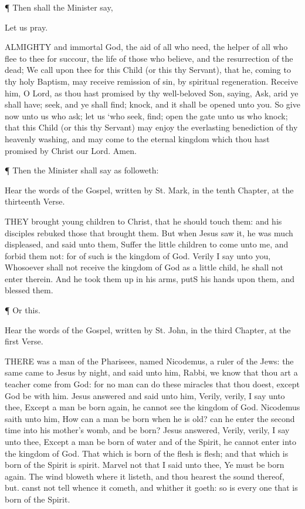¶ Then shall the Minister say,

Let us pray.

ALMIGHTY and immortal God, the aid of all who need, the helper of all who flee to thee for succour, the life of those who believe, and the resurrection of the dead; We call upon thee for this Child (or this thy Servant), that he, coming to thy holy Baptism, may receive remission of sin, by spiritual regeneration. Receive him, O Lord, as thou hast promised by thy well-beloved Son, saying, Ask, arid ye shall have; seek, and ye shall find; knock, and it shall be opened unto you. So give now unto us who ask; let us ‘who seek, find; open the gate unto us who knock; that this Child (or this thy Servant) may enjoy the everlasting benediction of thy heavenly washing, and may come to the eternal kingdom which thou hast promised by Christ our Lord. Amen.
 

 
¶ Then the Minister shall say as followeth:

    Hear the words of the Gospel, written by St. Mark, in the tenth Chapter, at the thirteenth Verse.

THEY brought young children to Christ, that he should touch them: and his disciples rebuked those that brought them. But when Jesus saw it, he was much displeased, and said unto them, Suffer the little children to come unto me, and forbid them not: for of such is the kingdom of God. Verily I say unto you, Whosoever shall not receive the kingdom of God as a little child, he shall not enter therein. And he took them up in his arms, putS his hands upon them, and blessed them.

¶ Or this.

    Hear the words of the Gospel, written by St. John, in the third Chapter, at the first Verse.

THERE was a man of the Pharisees, named Nicodemus, a ruler of the Jews: the same came to Jesus by night, and said unto him, Rabbi, we know that thou art a teacher come from God: for no man can do these miracles that thou doest, except God be with him. Jesus answered and said unto him, Verily, verily, I say unto thee, Except a man be born again, he cannot see the kingdom of God. Nicodemus saith unto him, How can a man be born when he is old? can he enter the second time into his mother’s womb, and be born? Jesus answered, Verily, verily, I say unto thee, Except a man be born of water and of the Spirit, he cannot enter into the kingdom of God. That which is born of the flesh is flesh; and that which is born of the Spirit is spirit. Marvel not that I said unto thee, Ye must be born again. The wind bloweth where it listeth, and thou hearest the sound thereof, but. canst not tell whence it cometh, and whither it goeth: so is every one that is born of the Spirit.

